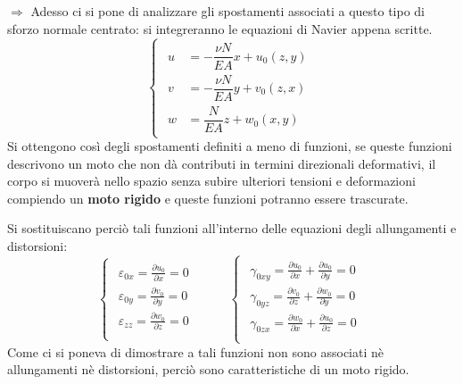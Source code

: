 \documentclass{article}
\begin{document}
\begin{adjustwidth}{2in}{}
 	\item[$\Rightarrow$] Adesso ci si pone di analizzare gli spostamenti associati a questo tipo di sforzo normale centrato: si integreranno le equazioni di Navier appena scritte.
 \[ \begin{cases}
 	\begin{aligned}
 	u & = -\dfrac{\nu N}{EA}x + u_0(z,y) \\
 	v & = -\dfrac{\nu N}{EA}y + v_0(z,x) \\
 	w & = \dfrac{N}{EA}z + w_0(x,y)
 	\end{aligned}
 \end{cases} \]
	Si ottengono così degli spostamenti definiti a meno di funzioni, se queste funzioni descrivono un moto che non dà contributi in termini direzionali deformativi, il corpo si muoverà nello spazio senza subire ulteriori tensioni e deformazioni compiendo un \textbf{moto rigido} e queste funzioni potranno essere trascurate. 
	
	Si sostituiscano perciò tali funzioni all'interno delle equazioni degli allungamenti e distorsioni:
		\[ 
	\begin{cases}
		\begin{aligned}
			\varepsilon_{0x} =   \frac{\partial u_0}{\partial x} = 0 \\
			\varepsilon_{0y} =   \frac{\partial v_0}{\partial y} = 0 \\
			\varepsilon_{zz} =   \frac{\partial w_0}{\partial z} = 0 \\
		\end{aligned}
	\end{cases} \hspace{1cm} \begin{cases}
		\begin{aligned}
			\gamma_{0xy} =   \frac{\partial u_0}{\partial x} + \frac{\partial u_0}{\partial y} = 0\\
			\gamma_{0yz} =   \frac{\partial v_0}{\partial z} + \frac{\partial w_0}{\partial y} =  0 \\
			\gamma_{0zx} =   \frac{\partial w_0}{\partial x} + \frac{\partial u_0}{\partial z} =  0 \\
		\end{aligned}
	\end{cases}
	\]
	Come ci si poneva di dimostrare a tali funzioni non sono associati nè allungamenti nè distorsioni, perciò sono caratteristiche di un moto rigido. \newline
	

\end{adjustwidth}
\end{document}
